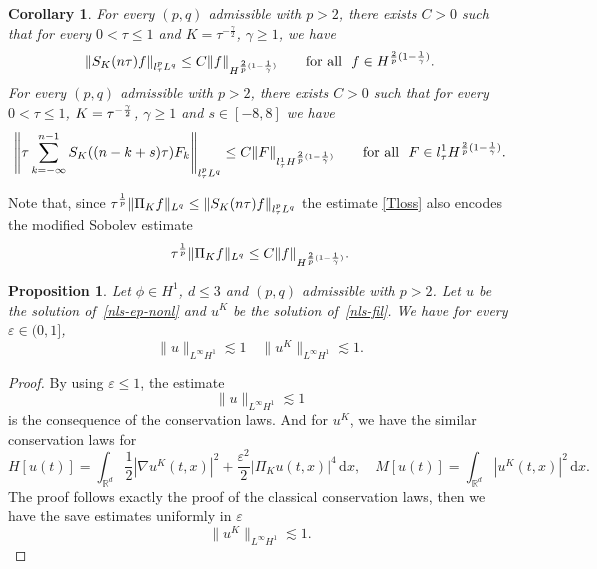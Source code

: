 \documentclass[10pt,a4paper]{article}
\newtheorem{corollary}[theorem]{Corollary}
\newtheorem{proposition}[theorem]{Proposition}
\begin{document}
  \begin{corollary}\label{corDSE}
    For every $(p,q)$ admissible with $p>2$, there exists $C>0$ such that for every $0<\tau \leq 1$ and $K = \tau^{-\frac\gamma2}$, $\gamma \geq 1$,  we have
    \begin{equation}
    \label{Tloss}
    \left\| S_{K}(n \tau) f\right\|_{l^p_{\tau}L^q} \leq C    \|f \|_{H^{ \frac2p(1 - \frac1\gamma) }}\qquad \text{for all \ $f\in H^{ {2 \over p}( 1 - {1 \over \gamma} ) }$}. 
    \end{equation}
    For every $(p, q)$ admissible with  $p>2$, there exists $C>0$ such that for every  $0<\tau \leq 1$, $K = \tau^{-{\gamma \over 2}}$,  $\gamma \ge 1$  and $s \in [-8,8]$ we have
    \begin{equation}
    \label{TT*loss}
    \left\| \tau  \sum_{k=-\infty}^{n-1}   S_{K} ((n-k+ s) \tau)  F_{k} \right\|_{l^{p}_{\tau}L^{q} } \leq C   \| F\|_{l^1_\tau  H^{ {2 \over p}( 1 - {1 \over \gamma} ) } }\qquad 
    \text{for all \ $F\in l^1_\tau  H^{ {2 \over p}( 1 - {1 \over \gamma} ) }$}. 
    \end{equation}
  \end{corollary}
  Note that, since $\tau^{1 \over p}\| \Pi_{K} f\|_{L^q} \leq  \left\| S_{K}(n \tau) f\right\|_{l^p_{\tau}L^q}$ 
  the estimate \eqref{Tloss} also encodes the modified Sobolev estimate
  \begin{equation}
    \label{sobmod}
    \tau^{1 \over p} \| \Pi_{K} f\|_{L^q} \leq C \|f \|_{H^{ {2 \over p}( 1 - {1 \over \gamma} ) }}.
  \end{equation}

  
  \begin{proposition}
    Let \(\phi \in H^1\), \( d \leq 3 \) and \( (p,q) \) admissible with
    \( p > 2 \). Let \( u \) be the solution of~\eqref{nls-ep-nonl} and \(u^K\)
    be the solution of~\eqref{nls-fil}. We have for every \( \varepsilon \in 
    (0,1] \),
    \begin{equation}
      \|u\|_{L^\infty H^1} \lesssim 1 \quad
      \|u^K\|_{L^\infty H^1} \lesssim 1.
    \end{equation}
  \end{proposition}
  
  \begin{proof}
    By using \( \varepsilon \leq 1 \), the estimate 
    \[ \|u\|_{L^\infty H^1} \lesssim 1 \]
    is the consequence of the conservation laws. And for \(u^K\), we have the
    similar conservation laws for 
    \[ H[u(t)] = \int_{\mathbb R^d} \frac12|\nabla u^K(t,x)|^2 + 
    \frac{\varepsilon^2}2 |\Pi_K u(t,x)|^4 \,\mathrm{d}x, \quad M[u(t)] = 
    \int_{\mathbb R^d} |u^K(t,x)|^2 \,\mathrm{d}x. \]
    The proof follows exactly the proof of the classical conservation laws, then
    we have the save estimates uniformly in \(\varepsilon\)
    \[ \|u^K\|_{L^\infty H^1} \lesssim 1.\]
  \end{proof}
\end{document}
